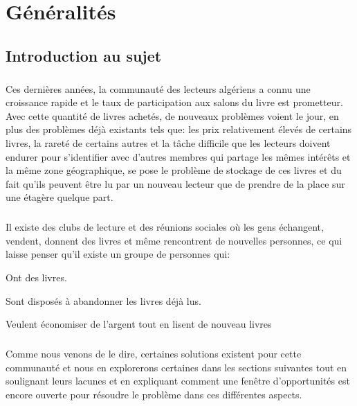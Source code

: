 

\chapter{Généralités}
\section{Introduction au sujet}

\paragraph*{}
Ces dernières années, la communauté des lecteurs algériens a connu une croissance rapide et le taux de participation aux salons du livre est prometteur. Avec cette quantité de livres achetés, de nouveaux problèmes voient le jour, en plus des problèmes déjà existants tels que: les prix relativement élevés de certains livres, la rareté de certains autres et la tâche difficile que les lecteurs doivent endurer pour s'identifier avec d'autres membres qui partage les mêmes intérêts et la même zone géographique, se pose le problème de stockage de ces livres et du fait qu’ils peuvent être lu par un nouveau lecteur que de prendre de la place sur une étagère quelque part.


\paragraph*{}
Il existe des clubs de lecture et des réunions sociales où les gens échangent, vendent, donnent des livres et même rencontrent de nouvelles personnes, ce qui laisse penser qu'il existe un groupe de personnes qui:

\begin{list}{•}{}
	\item Ont des livres.
	\item Sont disposés à abandonner les livres déjà lus.
	\item Veulent économiser de l’argent tout en lisent de nouveau livres
\end{list}

\paragraph*{}
Comme nous venons de le dire, certaines solutions existent pour cette communauté et nous en explorerons certaines dans les sections suivantes tout en soulignant leurs lacunes et en expliquant comment une fenêtre d'opportunités est encore ouverte pour résoudre le problème dans ces différentes aspects.

